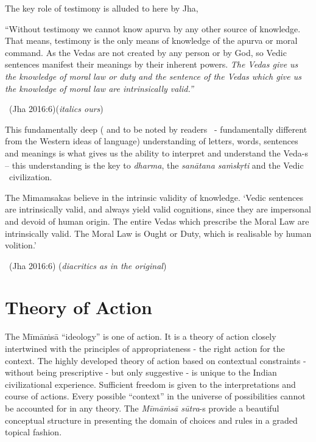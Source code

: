 The key role of testimony is alluded to here by Jha,

\begin{myquote}
“Without testimony we cannot know apurva by any other source of knowledge. That means, testimony is the only means of knowledge of the apurva or moral command. As the Vedas are not created by any person or by God, so Vedic sentences manifest their meanings by their inherent powers. \textit{The Vedas give us the knowledge of moral law or duty and the sentence of the Vedas which give us the knowledge of moral law are intrinsically valid.”}

~\hfill (Jha 2016:6)(\textit{italics ours})
\end{myquote}

This fundamentally deep ( and to be noted by readers  - fundamentally different from the Western ideas of language) understanding of letters, words, sentences and meanings is what gives us the ability to interpret and understand the Veda-s – this understanding is the key to \textit{dharma}, the \textit{sanātana saṁskṛti} and the Vedic  civilization.

\begin{myquote}
The Mimamsakas believe in the intrinsic validity of knowledge. ‘Vedic sentences are intrinsically valid, and always yield valid cognitions, since they are impersonal and devoid of human origin. The entire Vedas which prescribe the Moral Law are intrinsically valid. The Moral Law is Ought or Duty, which is realisable by human volition.’


~\hfill (Jha 2016:6) (\textit{diacritics as in the original})
\end{myquote}

\section*{Theory of Action}

The Mīmāṁsā “ideology” is one of action. It is a theory of action closely intertwined with the principles of appropriateness - the right action for the context. The highly developed theory of action based on contextual constraints - without being prescriptive - but only suggestive - is unique to the Indian civilizational experience. Sufficient freedom is given to the interpretations and course of actions. Every possible “context” in the universe of possibilities cannot be accounted for in any theory. The \textit{Mīmāṁsā sūtra}-s provide a beautiful conceptual structure in presenting the domain of choices and rules in a graded topical fashion.

